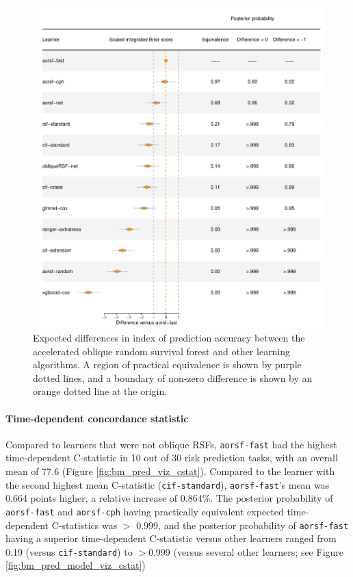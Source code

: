 \documentclass[twoside,11pt]{article}\usepackage[]{graphicx}\usepackage[]{xcolor}
\makeatletter
\def\maxwidth{ %
  \ifdim\Gin@nat@width>\linewidth
    \linewidth
  \else
    \Gin@nat@width
  \fi
}
\newenvironment{knitrout}{}{} %
\makeatother
\begin{document}
\begin{knitrout}
\color{fgcolor}\begin{figure}
\includegraphics[width=\maxwidth]{figure/bm_pred_model_viz_ibs-1} \caption[Expected differences in index of prediction accuracy between the accelerated oblique random survival forest and other learning algorithms]{Expected differences in index of prediction accuracy between the accelerated oblique random survival forest and other learning algorithms. A region of practical equivalence is shown by purple dotted lines, and a boundary of non-zero difference is shown by an orange dotted line at the origin.}\label{fig:bm_pred_model_viz_ibs}
\end{figure}

\end{knitrout}

\paragraph{Time-dependent concordance statistic}




Compared to learners that were not oblique RSFs, \texttt{aorsf-fast} had the highest time-dependent C-statistic in 10 out of 30 risk prediction tasks, with an overall mean of 77.6 (Figure \ref{fig:bm_pred_viz_cstat}). Compared to the learner with the second highest mean C-statistic (\texttt{cif-standard}), \texttt{aorsf-fast}'s mean was 0.664 points higher, a relative increase of 0.864\%. The posterior probability of \texttt{aorsf-fast} and \texttt{aorsf-cph} having practically equivalent expected time-dependent C-statistics was $>$ 0.999, and the posterior probability of \texttt{aorsf-fast} having a superior time-dependent C-statistic versus other learners ranged from 0.19 (versus \texttt{cif-standard}) to $>$0.999 (versus several other learners; see Figure \ref{fig:bm_pred_model_viz_cstat})
\end{document}

